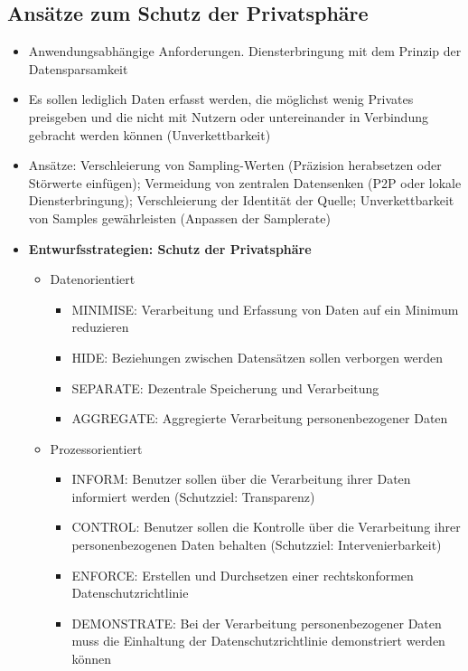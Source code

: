 \subsection{Ansätze zum Schutz der Privatsphäre}
\begin{itemize}
	\item Anwendungsabhängige Anforderungen. Diensterbringung mit dem Prinzip der Datensparsamkeit
	\item Es sollen lediglich Daten erfasst werden, die möglichst wenig Privates preisgeben und die nicht mit Nutzern oder untereinander in Verbindung gebracht werden können (Unverkettbarkeit)
	\item Ansätze: Verschleierung von Sampling-Werten (Präzision herabsetzen oder Störwerte einfügen); Vermeidung von zentralen Datensenken (P2P oder lokale Diensterbringung); Verschleierung der Identität der Quelle; Unverkettbarkeit von Samples gewährleisten (Anpassen der Samplerate)
	\item \textbf{Entwurfsstrategien: Schutz der Privatsphäre}
	\begin{itemize}
		\item Datenorientiert
		\begin{itemize}
			\item MINIMISE: Verarbeitung und Erfassung von Daten auf ein Minimum reduzieren
			\item HIDE: Beziehungen zwischen Datensätzen sollen verborgen werden
			\item SEPARATE: Dezentrale Speicherung und Verarbeitung
			\item AGGREGATE: Aggregierte Verarbeitung personenbezogener Daten
		\end{itemize}
		\item Prozessorientiert
		\begin{itemize}
			\item INFORM: Benutzer sollen über die Verarbeitung ihrer Daten informiert werden (Schutzziel: Transparenz)
			\item CONTROL: Benutzer sollen die Kontrolle über die Verarbeitung ihrer personenbezogenen Daten behalten (Schutzziel: Intervenierbarkeit)
			\item ENFORCE: Erstellen und Durchsetzen einer rechtskonformen Datenschutzrichtlinie
			\item DEMONSTRATE: Bei der Verarbeitung personenbezogener Daten muss die Einhaltung der Datenschutzrichtlinie demonstriert werden können
		\end{itemize}
	\end{itemize}
\end{itemize}

